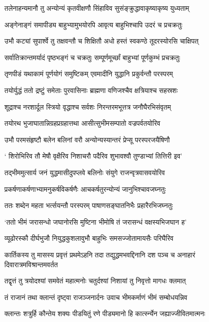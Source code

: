 \twolineshloka
{तलेनाहन्यमानौ तु अन्योन्यं कृतवीक्षणौ}
{सिंहाविव सुसंङ्क्रुद्धावाकृष्याकृष्य युध्यताम्}


\twolineshloka
{अङ्गेनाङ्गं समापीड्य बाहुभ्यामुभयोरपि}
{आवृत्य बाहुभिश्चापि उदरं च प्रचक्रतुः}


\twolineshloka
{उभौ कट्यां सुपार्श्वे तु तक्षवन्तौ च शिक्षितौ}
{अधो हस्तं स्वकण्ठे तूदरस्योरसि चाक्षिपत्}


\twolineshloka
{सर्वातिक्रान्तमर्यादं पृष्ठभङ्गं च चक्रतुः}
{सम्पूर्णमूर्च्छां बाहुभ्यां पूर्णकुम्भं प्रचक्रतुः}


\twolineshloka
{तृणपीडं यथाकामं पूर्णयोगं समुष्टिकम्}
{एवमादीनि युद्धानि प्रकुर्वन्तौ परस्परम्}


\twolineshloka
{तयोर्युद्धं ततो द्रष्टुं समेताः पुरवासिनाः}
{ब्राह्मणा वणिजश्चैव क्षत्रियाश्च सहस्रशः}


\twolineshloka
{शूद्राश्च नरशार्दूल स्त्रियो वृद्धाश्च सर्वशः}
{निरन्तरमभूत्तत्र जनौघैरभिसंवृतम्}


\twolineshloka
{तयोरथ भुजाघातान्निग्रहप्रग्रहात्तथा}
{आसीत्सुभीमसम्पातो वज्रपर्वतयोरिव}


\twolineshloka
{उभौ परमसंहृष्टौ बलेन बलिनां वरौ}
{अन्योन्यस्यान्तरं प्रेप्सू परस्परजयैषिणौ}


\twolineshloka
{` शिरोभिरिव तौ मेषौ वृक्षैरिव निशाचरौ}
{पदैरिव शुभावश्वौ तुण्डाभ्यां तित्तिरी इव'}


\twolineshloka
{तद्भीममुत्सार्य जनं युद्धमासीदुपप्लवे}
{बलिनोः संयुगे राजन्वृत्रवासवयोरिव}


\twolineshloka
{प्रकर्षणाकर्षणाभ्यामनुकर्षविकर्षणैः}
{आचकर्षतुरन्योन्यं जानुभिश्चावजघ्नतुः}


\twolineshloka
{ततः शब्देन महता भर्त्सयन्तौ परस्परम्}
{पाषाणसङ्घातनिभैः प्रहारैरभिजघ्नतुः}


\twolineshloka
{`ततो भीमं जरासन्धो जघानोरसि मुष्टिना}
{भीमोषि तं जरासन्धं वक्षस्यभिजघान ह'}


\twolineshloka
{व्यूढोरस्कौ दीर्घभुजौ नियुद्धकुशलावुभौ}
{बाहुभिः समसज्जोतामायसैः परिघैरिव}


\threelineshloka
{कार्तिकस्य तु मासस्य प्रवृत्तं प्रथमेऽहनि}
{तदा तद्युद्धमभवद्दिनानि दश पञ्च च}
{अनाहारं दिवारात्रमविश्रान्तमवर्तत}


\twolineshloka
{तद्वृत्तं तु त्रयोदश्यां समवेतं महात्मनोः}
{चतुर्दश्यां निशायां तु निवृत्तो मागधः क्लमात्}


\twolineshloka
{तं राजानं तथा क्लान्तं दृष्ट्वा राजञ्जनार्दनः}
{उवाच भीमकर्माणं भीमं सम्बोधयन्निव}


\twolineshloka
{क्लान्तः शत्रुर्हि कौन्तेय शक्यः पीडयितुं रणे}
{पीड्यमानो हि कार्त्स्न्येन जह्याज्जीवितमात्मनः}


